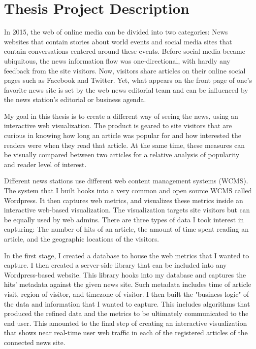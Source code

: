 \documentclass[12pt]{article}
\begin{document}
\begin{singlespace}
\tableofcontents
\end{singlespace}

\vfill

\section{Thesis Project Description}
In 2015, the web of online media can be divided into two categories: News websites that contain stories about world events and social media sites that contain conversations centered around these events. Before social media became ubiquitous, the news information flow was one-directional, with hardly any feedback from the site visitors. Now, visitors share articles on their online social pages such as Facebook and Twitter. Yet, what appears on the front page of one's favorite news site is set by the web news editorial team and can be influenced by the news station's editorial or business agenda. 

My goal in this thesis is to create a different way of seeing the news, using an interactive web visualization. The product is geared to site visitors that are curious in knowing how long an article was popular for and how interested the readers were when they read that article. At the same time, these measures can be visually compared between two articles for a relative analysis of popularity and reader level of interest. 

Different news stations use different web content management systems (WCMS). The system that I built hooks into a very common and open source WCMS called Wordpress. It then captures web metrics, and visualizes these metrics inside an interactive web-based visualization. The visualization targets site visitors but can be equally used by web admins. There are three types of data I took interest in capturing: The number of hits of an article, the amount of time spent reading an article, and the geographic locations of the visitors. 

In the first stage, I created a database to house the web metrics that I wanted to capture. I then created a server-side library that can be included into any Wordpress-based website. This library hooks into my database and captures the hits' metadata against the given news site. Such metadata includes time of article visit, region of visitor, and timezone of visitor.  
I then built the "business logic" of the data and information that I wanted to capture. This includes algorithms that produced the refined data and the metrics to be ultimately communicated to the end user.
This amounted to the final step of creating an interactive visualization that shows near real-time user web traffic in each of the registered articles of the connected news site.
\end{document}
